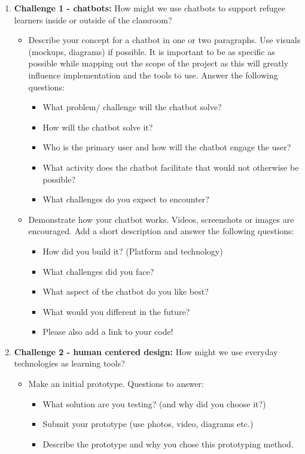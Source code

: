 \documentclass[12pt,twoside]{mitthesis}
\begin{document}
\begin{enumerate}
\item \textbf{Challenge 1 - chatbots:} How might we use chatbots to support refugee learners inside or outside of the classroom? 
\begin{itemize}
\item Describe your concept for a chatbot in one or two paragraphs. Use visuals (mockups, diagrams) if possible. It is important to be as specific as possible while mapping out the scope of the project as this will greatly influence implementation and the tools to use. Answer the following questions:
\begin{itemize}
\item What problem/ challenge will the chatbot solve? 
\item How will the chatbot solve it? 
\item Who is the primary user and how will the chatbot engage the user?
\item What activity does the chatbot facilitate that would not otherwise be possible? 
\item What challenges do you expect to encounter?
\end{itemize}
\item Demonstrate how your chatbot works. Videos, screenshots or images are encouraged. Add a short description and answer the following questions: 
\begin{itemize}
\item How did you build it? (Platform and technology)
\item What challenges did you face?
\item What aspect of the chatbot do you like best? 
\item What would you different in the future? 
\item Please also add a link to your code!
\end{itemize}
\end{itemize}
\item \textbf{Challenge 2 - human centered design:} How might we use everyday technologies as learning tools?
\begin{itemize}
\item Make an initial prototype. Questions to answer:
\begin{itemize}
\item What solution are you testing? (and why did you choose it?)
\item Submit your prototype (use photos, video, diagrams etc.)
\item Describe the prototype and why you chose this prototyping method. 

\end{itemize}
\end{itemize}
\end{enumerate}
\end{document}
